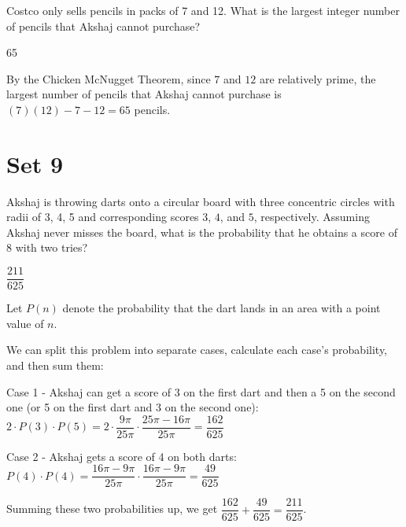 \documentclass[11pt]{article}
\begin{document}
\begin{problem}
Costco only sells pencils in packs of 7 and 12. What is the largest integer number of pencils that Akshaj cannot purchase?
\end{problem}

\begin{answer}
65
\end{answer}

\begin{solution}
By the Chicken McNugget Theorem, since $7$ and $12$ are relatively prime, the largest number of pencils that Akshaj cannot purchase is $(7)(12)-7-12 = 65$ pencils.
\end{solution} 

\newpage

\section*{Set 9}

\begin{problem}
Akshaj is throwing darts onto a circular board with three concentric circles with radii of 3, 4, 5 and corresponding scores $3$, $4$, and $5$, respectively. Assuming Akshaj never misses the board, what is the probability that he obtains a score of 8 with two tries? 
\end{problem}

\begin{answer}
$\dfrac{211}{625}$
\end{answer}

\begin{solution}
Let $P(n)$ denote the probability that the dart lands in an area with a point value of $n$.

We can split this problem into separate cases, calculate each case's probability, and then sum them:

Case 1 - Akshaj can get a score of 3 on the first dart and then a 5 on the second one (or 5 on the first dart and 3 on the second one): $2 \cdot P(3) \cdot P(5) = 2 \cdot \dfrac{9\pi}{25\pi} \cdot \dfrac{25\pi-16\pi}{25\pi} = \dfrac{162}{625}$

Case 2 - Akshaj gets a score of 4 on both darts: $ P(4) \cdot P(4) = \dfrac{16\pi-9\pi}{25\pi} \cdot  \dfrac{16\pi-9\pi}{25\pi} = \dfrac{49}{625}$

Summing these two probabilities up, we get $\dfrac{162}{625} + \dfrac{49}{625} = \dfrac{211}{625}$.
\end{solution}
\end{document}
